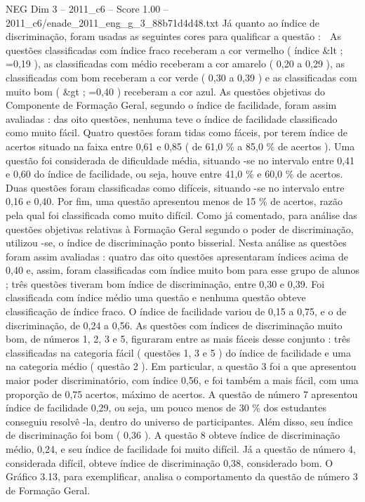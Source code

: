 \begin{textsample}{NEG Dim 3 – 2011\_c6 – Score 1.00 – 2011\_c6/enade\_2011\_eng\_g\_3\_88b71d4d48.txt}
Já quanto ao índice de discriminação, foram usadas as seguintes cores para qualificar a questão :  As questões classificadas com índice fraco receberam a cor vermelho ( índice \&lt ; =0,19 ), as classificadas com médio receberam a cor amarelo ( 0,20 a 0,29 ), as classificadas com bom receberam a cor verde ( 0,30 a 0,39 ) e as classificadas com muito bom ( \&gt ; =0,40 ) receberam a cor azul.
As questões objetivas do Componente de Formação Geral, segundo o índice de facilidade, foram assim avaliadas : das oito questões, nenhuma teve o índice de facilidade classificado como muito fácil.
Quatro questões foram tidas como fáceis, por terem índice de acertos situado na faixa entre 0,61 e 0,85 ( de 61,0 \% a 85,0 \% de acertos ).
Uma questão foi considerada de dificuldade média, situando -se no intervalo entre 0,41 e 0,60 do índice de facilidade, ou seja, houve entre 41,0 \% e 60,0 \% de acertos.
Duas questões foram classificadas como difíceis, situando -se no intervalo entre 0,16 e 0,40.
Por fim, uma questão apresentou menos de 15 \% de acertos, razão pela qual foi classificada como muito difícil.
Como já comentado, para análise das questões objetivas relativas à Formação Geral segundo o poder de discriminação, utilizou -se, o índice de discriminação ponto bisserial.
Nesta análise as questões foram assim avaliadas : quatro das oito questões apresentaram índices acima de 0,40 e, assim, foram classificadas com índice muito bom para esse grupo de alunos ; três questões tiveram bom índice de discriminação, entre 0,30 e 0,39.
Foi classificada com índice médio uma questão e nenhuma questão obteve classificação de índice fraco.
O índice de facilidade variou de 0,15 a 0,75, e o de discriminação, de 0,24 a 0,56.
As questões com índices de discriminação muito bom, de números 1, 2, 3 e 5, figuraram entre as mais fáceis desse conjunto : três classificadas na categoria fácil ( questões 1, 3 e 5 ) do índice de facilidade e uma na categoria médio ( questão 2 ).
Em particular, a questão 3 foi a que apresentou maior poder discriminatório, com índice 0,56, e foi também a mais fácil, com uma proporção de 0,75 acertos, máximo de acertos.
A questão de número 7 apresentou índice de facilidade 0,29, ou seja, um pouco menos de 30 \% dos estudantes conseguiu resolvê -la, dentro do universo de participantes.
Além disso, seu índice de discriminação foi bom ( 0,36 ).
A questão 8 obteve índice de discriminação médio, 0,24, e seu índice de facilidade foi muito difícil.
Já a questão de número 4, considerada difícil, obteve índice de discriminação 0,38, considerado bom.
O Gráfico 3.13, para exemplificar, analisa o comportamento da questão de número 3 de Formação Geral.

\end{textsample}
